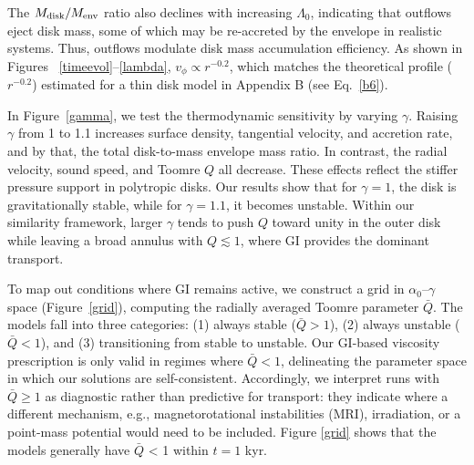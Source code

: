 \documentclass[twocolumn,linenumbers]{aastex631}
\begin{document}
The $M_{\rm disk}/M_{\rm env}$ ratio also declines with increasing $\Lambda_0$, indicating that outflows eject disk mass, some of which may be re-accreted by the envelope in realistic systems. Thus, outflows modulate disk mass accumulation efficiency.
As shown in Figures ~\ref{timeevol}–\ref{lambda}, $v_{\phi} \propto r^{-0.2}$, which matches the theoretical profile ($r^{-0.2}$) estimated for a thin disk model in Appendix B (see Eq.~\ref{b6}).

In Figure~\ref{gamma}, we test the thermodynamic sensitivity by varying $\gamma$. Raising $\gamma$ from 1 to 1.1 increases surface density, tangential velocity, and accretion rate, and by that, the total disk-to-mass envelope mass ratio. In contrast, the radial velocity, sound speed, and Toomre $Q$ all decrease. These effects reflect the stiffer pressure support in polytropic disks. Our results show that for $\gamma = 1$, the disk is gravitationally stable, while for $\gamma = 1.1$, it becomes unstable. Within our similarity framework, larger $\gamma$ tends to push $Q$ toward unity in the outer disk while leaving a broad annulus with $Q\!\lesssim\!1$, where GI provides the dominant transport.

To map out conditions where GI remains active, we construct a grid in $\alpha_{0}$–$\gamma$ space (Figure~\ref{grid}), computing the radially averaged Toomre parameter $\bar{Q}$. The models fall into three categories: (1) always stable ($\bar{Q} > 1$), (2) always unstable ($\bar{Q} < 1$), and (3) transitioning from stable to unstable. Our GI-based viscosity prescription is only valid in regimes where $\bar{Q} < 1$, delineating the parameter space in which our solutions are self-consistent. Accordingly, we interpret runs with $\bar{Q}\!\ge\!1$ as diagnostic rather than predictive for transport: they indicate where a different mechanism, e.g., magnetorotational instabilities (MRI), irradiation, or a point-mass potential would need to be included. Figure \ref{grid} shows that the models generally have $\bar{Q}$ < 1 within $t = 1$ kyr.

\end{document}

